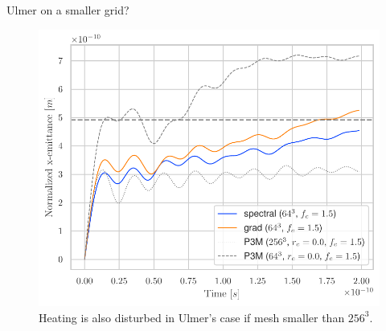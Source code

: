\begin{frame}{Ulmer on a smaller grid?}
    \begin{figure}[!htb]
        \centering
        \captionsetup{justification=centering}
      \includegraphics[width=0.6\linewidth]{figures/comparison_64_grid.pdf}
        \caption{Heating is also disturbed in Ulmer's case if mesh smaller than $256^3$.} 
      \label{fig:awesome_image6}
    \end{figure}
\end{frame}

